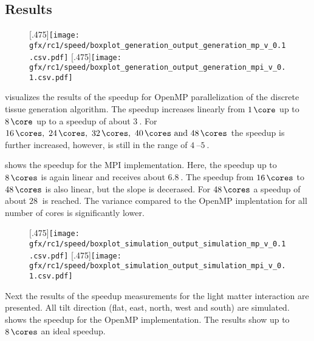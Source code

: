 \subsection{Results}
% 
\begin{figure}[!t]
\centering
{}[.475\textwidth]{\texttt{[image: gfx/rc1/speed/boxplot\_generation\_output\_generation\_mp\_v\_0.1.csv.pdf]}}
\hfill
{}[.475\textwidth]{\texttt{[image: gfx/rc1/speed/boxplot\_generation\_output\_generation\_mpi\_v\_0.1.csv.pdf]}}
\caption{}
\end{figure}
%
 visualizes the results of the speedup for \ac{OpenMP} parallelization of the discrete tissue generation algorithm.
The speedup increases linearly from $\SI{1}{\core}$ up to $\SI{8}{\core}$ up to a speedup of about $\SI{3}{}$.
For $\SIlist{16;24;32;40;48}{\cores}$ the speedup is further increased, however, is still in the range of $\SIrange{4}{5}{}$.
\par
% 
 shows the speedup for the \ac{MPI} implementation.
Here, the speedup up to $\SI{8}{\cores}$ is again linear and receives about $\SI{6.8}{}$.
The speedup from $\SI{16}{\cores}$ to $\SI{48}{\cores}$ is also linear, but the slope is decerased.
For $\SI{48}{\cores}$ a speedup of about $\SI{28}{}$ is reached.
The variance compared to the \ac{OpenMP} implentation for all number of cores is significantly lower.
\par
% 
\begin{figure}[!t]
\centering
{}[.475\textwidth]{\texttt{[image: gfx/rc1/speed/boxplot\_simulation\_output\_simulation\_mp\_v\_0.1.csv.pdf]}}
\hfill
{}[.475\textwidth]{\texttt{[image: gfx/rc1/speed/boxplot\_simulation\_output\_simulation\_mpi\_v\_0.1.csv.pdf]}}
\caption{}
\end{figure}
%
Next the results of the speedup measurements for the light matter interaction are presented.
All tilt direction (flat, east, north, west and south) are simulated.
 shows the speedup for the \ac{OpenMP} implementation.
The results show up to $\SI{8}{\cores}$ an ideal speedup.
